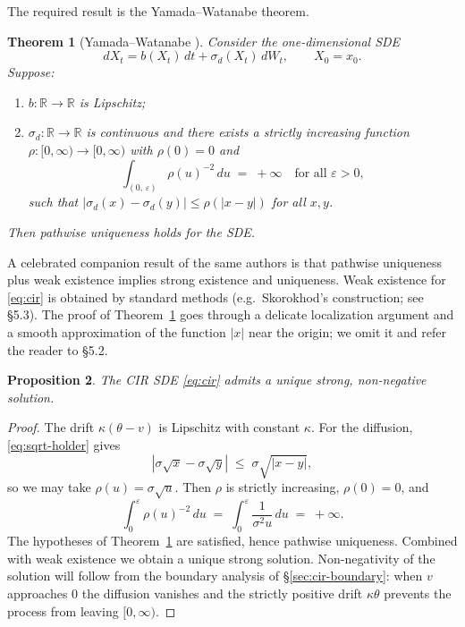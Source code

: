 \documentclass[11pt]{article}
\theoremstyle{plain}
\newtheorem{theorem}{Theorem}[section]
\newtheorem{proposition}[theorem]{Proposition}
\theoremstyle{definition}
\theoremstyle{remark}
\begin{document}
The required result is the Yamada--Watanabe theorem.

\begin{theorem}[Yamada--Watanabe \cite{YamadaWatanabe1971}]\label{thm:YW}
    Consider the one-dimensional SDE
    \[
        dX_t = b(X_t)\,dt + \sigma_d(X_t)\,dW_t, \qquad X_0 = x_0.
    \]
    Suppose:
    \begin{enumerate}[label=(\roman*),topsep=2pt]
        \item \(b: \mathbb{R} \to \mathbb{R}\) is Lipschitz;
        \item \(\sigma_d: \mathbb{R} \to \mathbb{R}\) is continuous and there exists a strictly increasing function \(\rho: [0, \infty) \to [0, \infty)\) with \(\rho(0) = 0\) and
        \[
            \int_{(0,\,\varepsilon)} \rho(u)^{-2}\,du \;=\; +\infty \quad \text{for all } \varepsilon > 0,
        \]
        such that \(|\sigma_d(x) - \sigma_d(y)| \leq \rho(|x - y|)\) for all \(x, y\).
    \end{enumerate}
    Then pathwise uniqueness holds for the SDE.
\end{theorem}

A celebrated companion result of the same authors is that pathwise uniqueness plus weak existence implies strong existence and uniqueness. Weak existence for \eqref{eq:cir} is obtained by standard methods (e.g.\ Skorokhod's construction; see \cite{KaratzasShreve1991} \S5.3). The proof of Theorem~\ref{thm:YW} goes through a delicate localization argument and a smooth approximation of the function \(|x|\) near the origin; we omit it and refer the reader to \cite{KaratzasShreve1991} \S5.2.

\begin{proposition}\label{prop:cir-existence}
    The CIR SDE \eqref{eq:cir} admits a unique strong, non-negative solution.
\end{proposition}

\begin{proof}
    The drift \(\kappa(\theta - v)\) is Lipschitz with constant \(\kappa\). For the diffusion, \eqref{eq:sqrt-holder} gives
    \[
        |\sigma\sqrt{x} - \sigma\sqrt{y}| \;\leq\; \sigma\sqrt{|x - y|},
    \]
    so we may take \(\rho(u) = \sigma\sqrt{u}\). Then \(\rho\) is strictly increasing, \(\rho(0) = 0\), and
    \[
        \int_0^\varepsilon \rho(u)^{-2}\,du \;=\; \int_0^\varepsilon \frac{1}{\sigma^2 u}\,du \;=\; +\infty.
    \]
    The hypotheses of Theorem~\ref{thm:YW} are satisfied, hence pathwise uniqueness. Combined with weak existence we obtain a unique strong solution. Non-negativity of the solution will follow from the boundary analysis of \S\ref{sec:cir-boundary}: when \(v\) approaches \(0\) the diffusion vanishes and the strictly positive drift \(\kappa\theta\) prevents the process from leaving \([0, \infty)\).
\end{proof}
\end{document}
